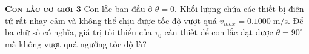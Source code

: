 \begin{problem}
\textbf{\textsc{Con lắc cơ giới 3}}
Con lắc ban đầu ở $\theta=0$. Khối lượng chứa các thiết bị điện tử rất nhạy cảm và không thể chịu được tốc độ vượt quá $v_{max}=0.1000\;\mathrm{m/s}$. Để ba chữ số có nghĩa, giá trị tối thiểu của $\tau_0$ cần thiết để con lắc đạt được $\theta=90^{\circ}$ mà không vượt quá ngưỡng tốc độ là?

\end{problem}
